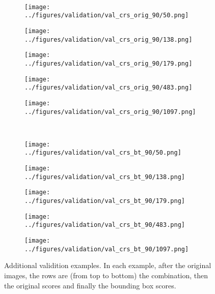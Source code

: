 \begin{figure}[h!]
		\vspace{-0.35cm}
	\\
	\begin{subfigure}{0.19\textwidth}
		\centering
		\texttt{[image: ../figures/validation/val\_crs\_orig\_90/50.png]}
		\label{fig:1}
	\end{subfigure}
	\begin{subfigure}{0.19\textwidth}
		\centering
		\texttt{[image: ../figures/validation/val\_crs\_orig\_90/138.png]}
		\label{fig:1}
	\end{subfigure}
	\begin{subfigure}{0.19\textwidth}
		\centering
		\texttt{[image: ../figures/validation/val\_crs\_orig\_90/179.png]}
		\label{fig:1}
	\end{subfigure}
	\begin{subfigure}{0.19\textwidth}
		\centering
		\texttt{[image: ../figures/validation/val\_crs\_orig\_90/483.png]}
		\label{fig:1}
	\end{subfigure}
	\begin{subfigure}{0.19\textwidth}
		\centering
		\texttt{[image: ../figures/validation/val\_crs\_orig\_90/1097.png]}
		\label{fig:1}
	\end{subfigure}
			\vspace{-0.35cm}
	\\
	\begin{subfigure}{0.19\textwidth}
		\centering
		\texttt{[image: ../figures/validation/val\_crs\_bt\_90/50.png]}
		\label{fig:1}
	\end{subfigure}
	\begin{subfigure}{0.19\textwidth}
		\centering
		\texttt{[image: ../figures/validation/val\_crs\_bt\_90/138.png]}
		\label{fig:1}
	\end{subfigure}
	\begin{subfigure}{0.19\textwidth}
		\centering
		\texttt{[image: ../figures/validation/val\_crs\_bt\_90/179.png]}
		\label{fig:1}
	\end{subfigure}
	\begin{subfigure}{0.19\textwidth}
		\centering
		\texttt{[image: ../figures/validation/val\_crs\_bt\_90/483.png]}
		\label{fig:1}
	\end{subfigure}
	\begin{subfigure}{0.19\textwidth}
		\centering
		\texttt{[image: ../figures/validation/val\_crs\_bt\_90/1097.png]}
		\label{fig:1}
	\end{subfigure}
	\label{fig:grid}
	\caption{Additional validition examples. In each example, after the original images, the rows are (from top to bottom) the combination, then the original scores and finally the bounding box scores.}\label{fig:polpys}
\end{figure}

